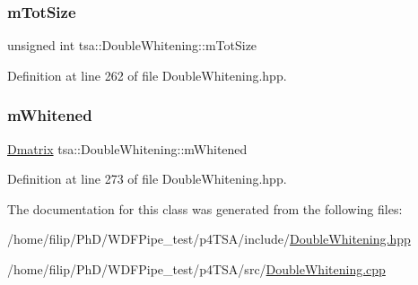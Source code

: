 \subsubsection{\texorpdfstring{m\+Tot\+Size}{mTotSize}}
{\footnotesize\ttfamily unsigned int tsa\+::\+Double\+Whitening\+::m\+Tot\+Size\hspace{0.3cm}{\ttfamily [private]}}



Definition at line 262 of file Double\+Whitening.\+hpp.

\mbox{\label{classtsa_1_1_double_whitening_ae27de92c8e9e51195590dc842ce211e6}} 
\subsubsection{\texorpdfstring{m\+Whitened}{mWhitened}}
{\footnotesize\ttfamily \hyperlink{namespacetsa_ad260cd21c1891c4ed391fe788569aba4}{Dmatrix} tsa\+::\+Double\+Whitening\+::m\+Whitened\hspace{0.3cm}{\ttfamily [private]}}



Definition at line 273 of file Double\+Whitening.\+hpp.



The documentation for this class was generated from the following files\+:\begin{DoxyCompactItemize}
\item 
/home/filip/\+Ph\+D/\+W\+D\+F\+Pipe\+\_\+test/p4\+T\+S\+A/include/\hyperlink{_double_whitening_8hpp}{Double\+Whitening.\+hpp}\item 
/home/filip/\+Ph\+D/\+W\+D\+F\+Pipe\+\_\+test/p4\+T\+S\+A/src/\hyperlink{_double_whitening_8cpp}{Double\+Whitening.\+cpp}\end{DoxyCompactItemize}
